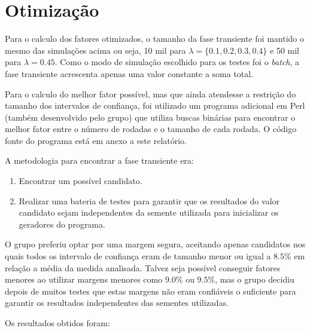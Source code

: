 \documentclass[a4paper,10pt]{article}
\begin{document}
\section{Otimização}

Para o calculo dos fatores otimizados, o tamanho da fase transiente foi mantido o mesmo das simulações acima ou seja, 10 mil para $\lambda = \{0.1, 0.2, 0.3, 0.4 \}$ e 50 mil para $\lambda = 0.45$. Como o modo de simulação escolhido para os testes foi o \emph{batch}, a fase transiente acrescenta apenas uma valor constante a soma total.

Para o calculo do melhor fator possível, mas que ainda atendesse a restrição do tamanho dos intervalos de confiança, foi utilizado um programa adicional em Perl (também desenvolvido pelo grupo) que utiliza buscas binárias para encontrar o melhor fator entre o número de rodadas e o tamanho de cada rodada. O código fonte do programa está em anexo a este relatório.

A metodologia para encontrar a fase transiente era:
\begin{enumerate}
	\item Encontrar um possível candidato.
	\item Realizar uma bateria de testes para garantir que os resultados do valor candidato sejam independentes da semente utilizada para inicializar os geradores do programa.
\end{enumerate}

O grupo preferiu optar por uma margem segura, aceitando apenas candidatos nos quais todos os intervalo de confiança eram de tamanho menor ou igual a $8.5\%$ em relação a média da medida analisada. Talvez seja possível conseguir fatores menores ao utilizar margens menores como $9.0\%$ ou $9.5\%$, mas o grupo decidiu depois de muitos testes que estas margens não eram confiáveis o suficiente para garantir os resultados independentes das sementes utilizadas.

Os resultados obtidos foram:
\end{document}
